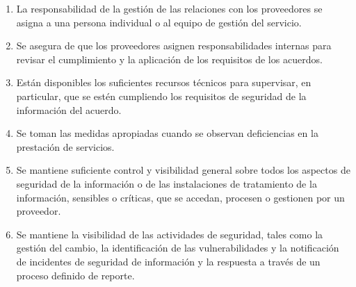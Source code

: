 \begin{enumerate}
    \item La responsabilidad de la gestión de las relaciones con los proveedores se asigna a una persona individual o al equipo de gestión del servicio.
    \item Se asegura de que los proveedores asignen responsabilidades internas para revisar el cumplimiento y la aplicación de los requisitos de los acuerdos.
    \item Están disponibles los suficientes recursos técnicos para supervisar, en particular, que se estén cumpliendo los requisitos de seguridad de la información del acuerdo.
    \item Se toman las medidas apropiadas cuando se observan deficiencias en la prestación de servicios.
    \item Se mantiene suficiente control y visibilidad general sobre todos los aspectos de seguridad de la información o de las instalaciones de tratamiento de la información, sensibles o críticas, que se accedan, procesen o gestionen por un proveedor.
    \item Se mantiene la visibilidad de las actividades de seguridad, tales como la gestión del cambio, la identificación de las vulnerabilidades y la notificación de incidentes de seguridad de información y la respuesta a través de un proceso definido de reporte.
\end{enumerate}